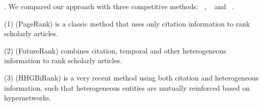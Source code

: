 


.
We compared our approach with three competitive methods: \pagerank~\cite{Brin98:PageRank}, \futurerank~\cite{sayyadi09} and \hhgrank~\cite{Liang16AAAI}.

\noindent
(1) \pagerank (PageRank) is a classic method that uses only citation information to rank scholarly articles.


\noindent
(2) \futurerank (FutureRank) combines citation, temporal and other heterogeneous information to rank scholarly articles.

\noindent
(3) \hhgrank (HHGBiRank) is a very recent method using both citation and heterogeneous information, such that heterogeneous entities are mutually reinforced based on hypernetworks.


